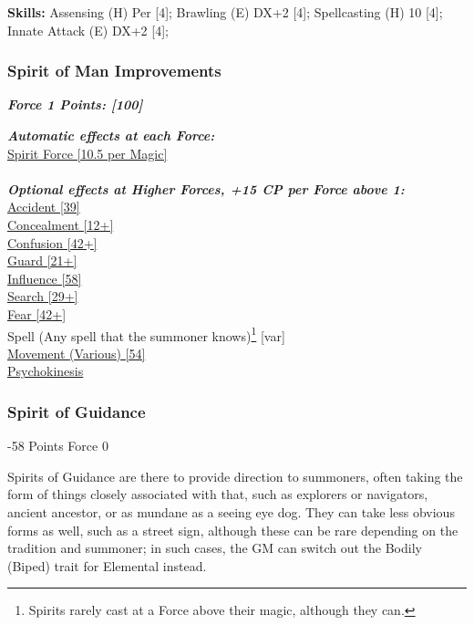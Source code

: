 \begin{multicols}{3}
	\textbf{Skills:}
	Assensing (H) Per [4]; Brawling (E) DX+2 [4]; Spellcasting (H) 10 [4]; Innate Attack (E) DX+2 [4];
	
	\subsubsection*{Spirit of Man Improvements}
	
	\textbf{\textit{Force 1 Points: [100]}}
	
	\textbf{\textit{Automatic effects at each Force:\\}}
	\hyperref[spirit_force]{Spirit Force [10.5 per Magic]}\\\\
	
	\textbf{\textit{Optional effects at Higher Forces, +15 CP per Force above 1:\\}}
	\hyperref[accident]{Accident [39]}\\
	\hyperref[concealment]{Concealment [12+]}\\
	\hyperref[confusion]{Confusion [42+]}\\
	\hyperref[guard]{Guard [21+]}\\
	\hyperref[influence]{Influence [58]}\\
	\hyperref[search]{Search [29+]}\\
	\hyperref[fear]{Fear [42+]}\\
	Spell (Any spell that the summoner knows)\footnote{Spirits rarely cast at a Force above their magic, although they can.} [var]\\
	\hyperref[movement]{Movement (Various) [54]}\\
	\hyperref[psychokinesis]{Psychokinesis}\\
	
	
	\subsubsection{Spirit of Guidance}
	\begin{flushright}
		-58 Points Force 0
	\end{flushright}
	
	Spirits of Guidance are there to provide direction to summoners, often taking the form of things closely associated with that, such as explorers or navigators, ancient ancestor, or as mundane as a seeing eye dog. They can take less obvious forms as well, such as a street sign, although these can be rare depending on the tradition and summoner; in such cases, the GM can switch out the Bodily (Biped) trait for Elemental instead.
	

\end{multicols}
